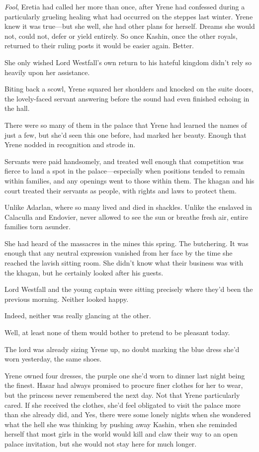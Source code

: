 \emph{Fool}, Eretia had called her more than once, after Yrene had confessed during a particularly grueling healing what had occurred on the steppes last winter. Yrene knew it was true---but she  well, she had other plans for herself. Dreams she would not, could not, defer or yield entirely. So once Kashin, once the other royals, returned to their ruling posts  it would be easier again. Better.

She only wished Lord Westfall's own return to his hateful kingdom didn't rely so heavily upon her assistance.

Biting back a scowl, Yrene squared her shoulders and knocked on the suite doors, the lovely-faced servant answering before the sound had even finished echoing in the hall.

There were so many of them in the palace that Yrene had learned the names of just a few, but she'd seen this one before, had marked her beauty. Enough that Yrene nodded in recognition and strode in.

Servants were paid handsomely, and treated well enough that competition was fierce to land a spot in the palace---especially when positions tended to remain within families, and any openings went to those within them. The khagan and his court treated their servants as people, with rights and laws to protect them.

Unlike Adarlan, where so many lived and died in shackles. Unlike the enslaved in Calaculla and Endovier, never allowed to see the sun or breathe fresh air, entire families torn asunder.

She had heard of the massacres in the mines this spring. The butchering. It was enough that any neutral expression vanished from her face by the time she reached the lavish sitting room. She didn't know what their business was with the khagan, but he certainly looked after his guests.

Lord Westfall and the young captain were sitting precisely where they'd been the previous morning. Neither looked happy.

Indeed, neither was really glancing at the other.

Well, at least none of them would bother to pretend to be pleasant today.

The lord was already sizing Yrene up, no doubt marking the blue dress she'd worn yesterday, the same shoes.

Yrene owned four dresses, the purple one she'd worn to dinner last night being the finest. Hasar had always promised to procure finer clothes for her to wear, but the princess never remembered the next day. Not that Yrene particularly cared. If she received the clothes, she'd feel obligated to visit the palace more than she already did, and 
Yes, there were some lonely nights when she wondered what the hell she was thinking by pushing away Kashin, when she reminded herself that most girls in the world would kill and claw their way to an open palace invitation, but she would not stay here for much longer.

